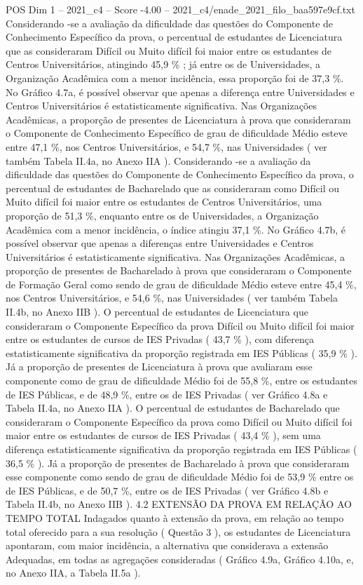 \begin{textsample}{POS Dim 1 – 2021\_c4 – Score -4.00 – 2021\_c4/enade\_2021\_filo\_baa597e9cf.txt}
Considerando -se a avaliação da dificuldade das questões do Componente de Conhecimento Específico da prova, o percentual de estudantes de Licenciatura que as consideraram Difícil ou Muito difícil foi maior entre os estudantes de Centros Universitários, atingindo 45,9 \% ; já entre os de Universidades, a Organização Acadêmica com a menor incidência, essa proporção foi de 37,3 \%.
No Gráfico 4.7a, é possível observar que apenas a diferença entre Universidades e Centros Universitários é estatisticamente significativa.
Nas Organizações Acadêmicas, a proporção de presentes de Licenciatura à prova que consideraram o Componente de Conhecimento Específico de grau de dificuldade Médio esteve entre 47,1 \%, nos Centros Universitários, e 54,7 \%, nas Universidades ( ver também Tabela II.4a, no Anexo IIA ).
Considerando -se a avaliação da dificuldade das questões do Componente de Conhecimento Específico da prova, o percentual de estudantes de Bacharelado que as consideraram como Difícil ou Muito difícil foi maior entre os estudantes de Centros Universitários, uma proporção de 51,3 \%, enquanto entre os de Universidades, a Organização Acadêmica com a menor incidência, o índice atingiu 37,1 \%.
No Gráfico 4.7b, é possível observar que apenas a diferenças entre Universidades e Centros Universitários é estatisticamente significativa.
Nas Organizações Acadêmicas, a proporção de presentes de Bacharelado à prova que consideraram o Componente de Formação Geral como sendo de grau de dificuldade Médio esteve entre 45,4 \%, nos Centros Universitários, e 54,6 \%, nas Universidades ( ver também Tabela II.4b, no Anexo IIB ).
O percentual de estudantes de Licenciatura que consideraram o Componente Específico da prova Difícil ou Muito difícil foi maior entre os estudantes de cursos de IES Privadas ( 43,7 \% ), com diferença estatisticamente significativa da proporção registrada em IES Públicas ( 35,9 \% ).
Já a proporção de presentes de Licenciatura à prova que avaliaram esse componente como de grau de dificuldade Médio foi de 55,8 \%, entre os estudantes de IES Públicas, e de 48,9 \%, entre os de IES Privadas ( ver Gráfico 4.8a e Tabela II.4a, no Anexo IIA ).
O percentual de estudantes de Bacharelado que consideraram o Componente Específico da prova como Difícil ou Muito difícil foi maior entre os estudantes de cursos de IES Privadas ( 43,4 \% ), sem uma diferença estatisticamente significativa da proporção registrada em IES Públicas ( 36,5 \% ).
Já a proporção de presentes de Bacharelado à prova que consideraram esse componente como sendo de grau de dificuldade Médio foi de 53,9 \% entre os de IES Públicas, e de 50,7 \%, entre os de IES Privadas ( ver Gráfico 4.8b e Tabela II.4b, no Anexo IIB ). 4.2 EXTENSÃO DA PROVA EM RELAÇÃO AO TEMPO TOTAL Indagados quanto à extensão da prova, em relação ao tempo total oferecido para a sua resolução ( Questão 3 ), os estudantes de Licenciatura apontaram, com maior incidência, a alternativa que considerava a extensão Adequadas, em todas as agregações consideradas ( Gráfico 4.9a, Gráfico 4.10a, e, no Anexo IIA, a Tabela II.5a ).

\end{textsample}
